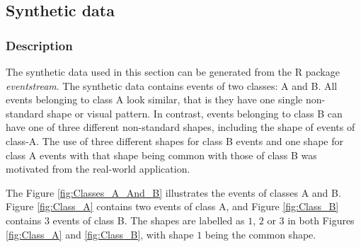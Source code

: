 \documentclass[11pt]{article}
\begin{document}
	\subsection{Synthetic data}\label{subsec:Synthetic}
	\subsubsection{Description}
 	The synthetic data used in this section can be generated from the R package {\it eventstream}. The synthetic data contains events of two classes: A and B. All events belonging to class A look similar, that is they have one single non-standard shape or visual pattern. In contrast, events belonging to class B  can have one of three different non-standard shapes, including the shape of events of class-A. The use of three different shapes for class B events and one shape for class A events with that shape being common with those of class B was motivated from the real-world application. 
 	
 	The Figure \ref{fig:Classes_A_And_B} illustrates the events of classes A and B.  Figure \ref{fig:Class_A} contains two events of class A, and Figure \ref{fig:Class_B} contains 3 events of class B. The shapes are labelled as $1$, $2$ or $3$ in both Figures \ref{fig:Class_A} and \ref{fig:Class_B}, with shape $1$ being the common shape.
  
   
\end{document}
